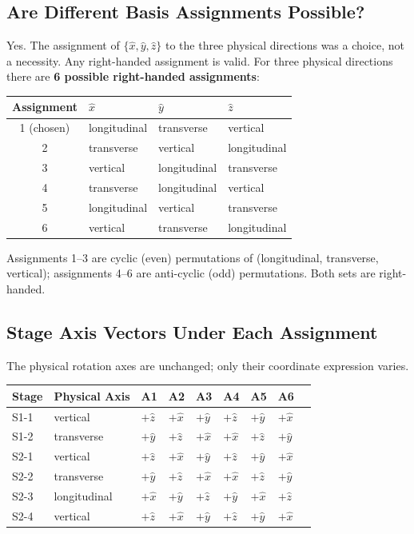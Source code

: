 \documentclass[12pt]{article}
\begin{document}
\subsection*{Are Different Basis Assignments Possible?}

Yes. The assignment of $\{\hat{x}, \hat{y}, \hat{z}\}$ to the three physical directions
was a choice, not a necessity. Any right-handed assignment is valid. For three physical
directions there are \textbf{6 possible right-handed assignments}:

\begin{center}
\begin{tabular}{clll}
\toprule
Assignment & $\hat{x}$ & $\hat{y}$ & $\hat{z}$ \\
\midrule
1 (chosen) & longitudinal & transverse      & vertical     \\
2          & transverse      & vertical     & longitudinal \\
3          & vertical     & longitudinal & transverse      \\
4          & transverse      & longitudinal & vertical     \\
5          & longitudinal & vertical     & transverse      \\
6          & vertical     & transverse      & longitudinal \\
\bottomrule
\end{tabular}
\end{center}

Assignments 1--3 are cyclic (even) permutations of (longitudinal, transverse, vertical);
assignments 4--6 are anti-cyclic (odd) permutations. Both sets are right-handed.

\subsection*{Stage Axis Vectors Under Each Assignment}

The physical rotation axes are unchanged; only their coordinate expression varies.

\begin{center}
\begin{tabular}{lllllllll}
\toprule
Stage & Physical Axis & A1 & A2 & A3 & A4 & A5 & A6 \\
\midrule
S1-1 & vertical     & $+\hat{z}$ & $+\hat{x}$ & $+\hat{y}$ & $+\hat{z}$ & $+\hat{y}$ & $+\hat{x}$ \\
S1-2 & transverse      & $+\hat{y}$ & $+\hat{z}$ & $+\hat{x}$ & $+\hat{x}$ & $+\hat{z}$ & $+\hat{y}$ \\
S2-1 & vertical     & $+\hat{z}$ & $+\hat{x}$ & $+\hat{y}$ & $+\hat{z}$ & $+\hat{y}$ & $+\hat{x}$ \\
S2-2 & transverse      & $+\hat{y}$ & $+\hat{z}$ & $+\hat{x}$ & $+\hat{x}$ & $+\hat{z}$ & $+\hat{y}$ \\
S2-3 & longitudinal & $+\hat{x}$ & $+\hat{y}$ & $+\hat{z}$ & $+\hat{y}$ & $+\hat{x}$ & $+\hat{z}$ \\
S2-4 & vertical     & $+\hat{z}$ & $+\hat{x}$ & $+\hat{y}$ & $+\hat{z}$ & $+\hat{y}$ & $+\hat{x}$ \\
\bottomrule
\end{tabular}
\end{center}
\end{document}

